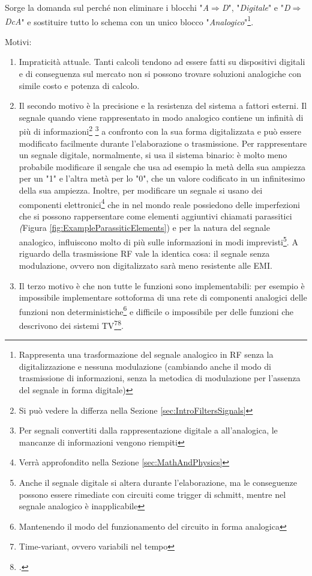 \documentclass[a4paper, 10pt, final]{article} %
\newcommand{\parenciteit}[2]{\textit{\parencite[#1]{#2}}} %
\begin{document}
    \noindent Sorge la domanda sul perch\'{e} non eliminare i blocchi "\emph{A$\Rightarrow$D}", "\emph{Digitale}" e "\emph{D$\Rightarrow$DcA}" e sostituire tutto lo schema con un unico blocco "\emph{Analogico}"\footnote{Rappresenta una trasformazione del segnale analogico in RF senza la digitalizzazione e nessuna modulazione (cambiando anche il modo di trasmissione di informazioni, senza la metodica di modulazione per l'assenza del segnale in forma digitale)}.

    \nopagebreak
    \noindent Motivi:
    \begin{enumerate}[label=\emph{(\arabic*)}]
        \item Impraticit\`{a} attuale.
        Tanti calcoli tendono ad essere fatti su dispositivi digitali e di conseguenza sul mercato non si possono trovare soluzioni analogiche con simile costo e potenza di calcolo.
        \item Il secondo motivo \`{e} la precisione e la resistenza del sistema a fattori esterni.
        Il segnale quando viene rappresentato in modo analogico contiene un infinit\`{a} di pi\`{u} di informazioni\footnote{Si pu\`{o} vedere la differza nella Sezione \ref{sec:IntroFiltersSignals}} \footnote{Per segnali convertiti dalla rappresentazione digitale a all'analogica, le mancanze di informazioni vengono riempiti} a confronto con la sua forma digitalizzata e pu\`{o} essere modificato facilmente durante l'elaborazione o trasmissione.
        Per rappresentare un segnale digitale, normalmente, si usa il sistema binario: \`{e} molto meno probabile modificare il sengale che usa ad esempio la met\`{a} della sua ampiezza per un "1" e l'altra met\`{a} per lo "0", che un valore codificato in un infinitesimo della sua ampiezza.
        Inoltre, per modificare un segnale si usano dei componenti elettronici\footnote{Verr\`{a} approfondito nella Sezione \ref{sec:MathAndPhysics}} che in nel mondo reale possiedono delle imperfezioni che si possono rappersentare come elementi aggiuntivi chiamati parassitici \emph(Figura \ref{fig:ExampleParassiticElements}) e per la natura del segnale analogico, influiscono molto di pi\`{u} sulle informazioni in modi imprevisti\footnote{Anche il segnale digitale si altera durante l'elaborazione, ma le conseguenze possono essere rimediate con circuiti come trigger di schmitt\parenciteit{}{SchmittTrigger:Wiki}, mentre nel segnale analogico \`{e} inapplicabile}.
        A riguardo della trasmissione RF vale la identica cosa: il segnale senza modulazione, ovvero non digitalizzato sar\`{a} meno resistente alle EMI.
        \item Il terzo motivo \`{e} che non tutte le funzioni sono implementabili: per esempio \`{e} impossibile implementare sottoforma di una rete di componenti analogici delle funzioni non deterministiche\footnote{Mantenendo il modo del funzionamento del circuito in forma analogica} e difficile o impossibile per delle funzioni che descrivono dei sistemi TV\footnote{Time-variant, ovvero variabili nel tempo}\:\footcite[]{TimeVariantSystem:Wiki}.
    \end{enumerate}
\end{document}
